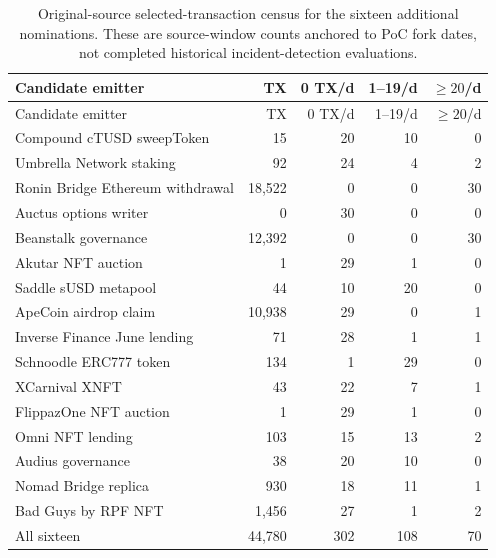 \small
\begin{longtable}{@{}p{6.9cm}rrrr@{}}
\caption{Original-source selected-transaction census for the sixteen additional nominations. These are source-window counts anchored to PoC fork dates, not completed historical incident-detection evaluations.}\label{tab:allcensus}\\
\toprule
Candidate emitter & TX & 0 TX/d & 1--19/d & $\geq20$/d\\
\midrule
\endfirsthead
\toprule
Candidate emitter & TX & 0 TX/d & 1--19/d & $\geq20$/d\\
\midrule
\endhead
Compound cTUSD sweepToken & 15 & 20 & 10 & 0\\
Umbrella Network staking & 92 & 24 & 4 & 2\\
Ronin Bridge Ethereum withdrawal & 18,522 & 0 & 0 & 30\\
Auctus options writer & 0 & 30 & 0 & 0\\
Beanstalk governance & 12,392 & 0 & 0 & 30\\
Akutar NFT auction & 1 & 29 & 1 & 0\\
Saddle sUSD metapool & 44 & 10 & 20 & 0\\
ApeCoin airdrop claim & 10,938 & 29 & 0 & 1\\
Inverse Finance June lending & 71 & 28 & 1 & 1\\
Schnoodle ERC777 token & 134 & 1 & 29 & 0\\
XCarnival XNFT & 43 & 22 & 7 & 1\\
FlippazOne NFT auction & 1 & 29 & 1 & 0\\
Omni NFT lending & 103 & 15 & 13 & 2\\
Audius governance & 38 & 20 & 10 & 0\\
Nomad Bridge replica & 930 & 18 & 11 & 1\\
Bad Guys by RPF NFT & 1,456 & 27 & 1 & 2\\
\midrule
All sixteen & 44,780 & 302 & 108 & 70\\
\bottomrule
\end{longtable}
\normalsize

